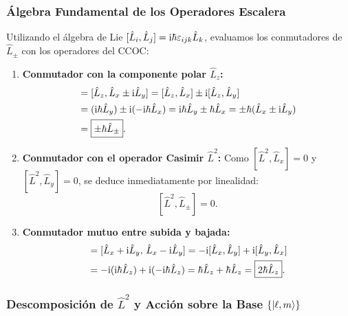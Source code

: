 \subsubsection{Álgebra Fundamental de los Operadores Escalera}

Utilizando el álgebra de Lie $[\hat{L}_i, \hat{L}_j] = \mathrm{i}\hbar\varepsilon_{ijk}\hat{L}_k$, evaluamos los conmutadores de $\hat{L}_\pm$ con los operadores del CCOC:
\begin{enumerate}
    \item \textbf{Conmutador con la componente polar $\hat{L}_z$:}
    \begin{align}
        [\hat{L}_z, \hat{L}_\pm] &= [\hat{L}_z, \hat{L}_x \pm \iu\hat{L}_y] = [\hat{L}_z, \hat{L}_x] \pm \iu[\hat{L}_z, \hat{L}_y] \nonumber\\
        &= (\iu\hbar\hat{L}_y) \pm \iu(-\iu\hbar\hat{L}_x) = \iu\hbar\hat{L}_y \pm \hbar\hat{L}_x = \pm\hbar(\hat{L}_x \pm \iu\hat{L}_y) \nonumber\\
        &= \boxed{\pm\hbar\hat{L}_\pm}.
        \label{eq:comm_lz_lpm}
    \end{align}
    \item \textbf{Conmutador con el operador Casimir $\hat{L}^2$:}
    Como $[\hat{L}^2, \hat{L}_x] = 0$ y $[\hat{L}^2, \hat{L}_y] = 0$, se deduce inmediatamente por linealidad:
    \begin{equation}
        \boxed{[\hat{L}^2, \hat{L}_\pm] = 0}.
        \label{eq:comm_l2_lpm}
    \end{equation}
    \item \textbf{Conmutador mutuo entre subida y bajada:}
    \begin{align}
        [\hat{L}_+, \hat{L}_-] &= [\hat{L}_x + \iu\hat{L}_y, \, \hat{L}_x - \iu\hat{L}_y] = -\iu[\hat{L}_x, \hat{L}_y] + \iu[\hat{L}_y, \hat{L}_x] \nonumber\\
        &= -\iu(\iu\hbar\hat{L}_z) + \iu(-\iu\hbar\hat{L}_z) = \hbar\hat{L}_z + \hbar\hat{L}_z = \boxed{2\hbar\hat{L}_z}.
        \label{eq:comm_lplus_lminus}
    \end{align}
\end{enumerate}

\subsubsection{Descomposición de $\hat{L}^2$ y Acción sobre la Base $\{\left| \ell, m \right\rangle\}$}

